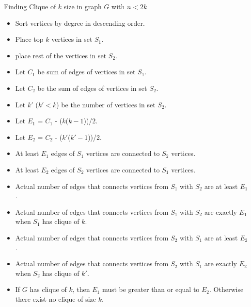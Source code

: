 \documentclass[landscape]{slides}
\begin{document}
\begin{slide}
\end{slide}


\begin{slide}
	\begin{center}{\large Finding Clique of $k$ size in graph $G$ with $n < 2k$}\end{center}
	\begin{itemize}
		\setlength{\itemsep}{0pt}
		\setlength{\parskip}{20pt}
		\setlength{\parsep}{0pt}
		\item Sort vertices by degree in descending order.
		\item Place top $k$ vertices in set $S_1$.
		\item place rest of the vertices in set $S_2$.
		\item Let $C_1$ be sum of edges of vertices in set $S_1$.
		\item Let $C_2$ be the sum of edges of vertices in set $S_2$.
		\item Let $k'$ ($k' < k$) be the number of vertices in set $S_2$.
		\item Let $E_1$ = $C_1$ - ($k$($k - 1$))/2.
		\item Let $E_2$ = $C_2$ - ($k'$($k' - 1$))/2.
		\item At least $E_1$ edges of $S_1$ vertices are connected to $S_2$ vertices.
		\item At least $E_2$ edges of $S_2$ vertices are connected to $S_1$ vertices.
		\item Actual number of edges that connects vertices from $S_1$ with $S_2$ are at least $E_1$.
		\item Actual number of edges that connects vertices from $S_1$ with $S_2$ are exactly $E_1$ when $S_1$ has clique of $k$.
		\item Actual number of edges that connects vertices from $S_2$ with $S_1$ are at least $E_2$.
		\item Actual number of edges that connects vertices from $S_2$ with $S_1$ are exactly $E_2$ when $S_2$ has clique of $k'$.
		\item If $G$ has clique of $k$, then $E_1$ must be greater than or equal to $E_2$. Otherwise there exist no clique of size $k$.

\end{itemize}
\end{slide}
\end{document}
